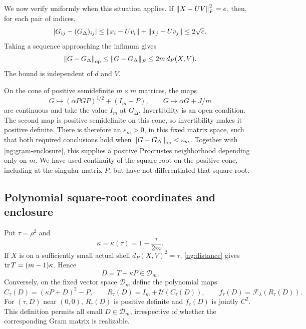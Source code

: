 We now verify uniformly when this situation applies. If
$\left\lVert X-UV\right\rVert_F^2=e$, then, for each pair of indices,
\[
 |G_{ij}-(G_\Delta)_{ij}|
 \le\left\lVert x_i-Uv_i\right\rVert+\left\lVert x_j-Uv_j\right\rVert\le2\sqrt e.
\]
Taking a sequence approaching the infimum gives
\begin{equation}\label{ng:gram-enclosure}
 \left\lVert G-G_\Delta\right\rVert_{\mathrm{op}}
 \le\left\lVert G-G_\Delta\right\rVert_F\le2m\,d_P(X,V).
\end{equation}
The bound is independent of $d$ and $V$.

On the cone of positive semidefinite $m\times m$ matrices, the maps
\[
 G\longmapsto(\alpha PGP)^{1/2}+(I_m-P),\qquad
 G\longmapsto\alpha G+J/m
\]
are continuous and take the value $I_m$ at $G_\Delta$.
Invertibility is an open condition. The second map is positive
semidefinite on this cone, so invertibility makes it positive definite.
There is therefore an $\varepsilon_m>0$, in this fixed matrix space,
such that both required conclusions hold when
$\left\lVert G-G_\Delta\right\rVert_{\mathrm{op}}<\varepsilon_m$.
Together with \eqref{ng:gram-enclosure}, this supplies a positive
Procrustes neighborhood depending only on $m$. We have used continuity
of the square root on the positive cone, including at the singular
matrix $P$, but have not differentiated that square root.

\subsection{Polynomial square-root coordinates and enclosure}
\label{ng:chart}

Put $\tau=\rho^2$ and
\[
 \kappa=\kappa(\tau)=1-\frac{\tau}{2m}.
\]
If $X$ is on a sufficiently small actual shell $d_P(X,V)^2=\tau$,
\eqref{ng:distance} gives $\operatorname{tr} T=(m-1)\kappa$. Hence
\begin{equation}\label{ng:actual-deviation}
 D=T-\kappa P\in\mathcal D_m.
\end{equation}
Conversely, on the fixed vector space $\mathcal D_m$ define the polynomial
maps
\begin{equation}\label{ng:polynomial-chart}
 C_\tau(D)=(\kappa P+D)^2-P,\qquad
 R_\tau(D)=I_m+\mathcal U(C_\tau(D)),\qquad
 f_\tau(D)=\mathcal F_\lambda(R_\tau(D)).
\end{equation}
For $(\tau,D)$ near $(0,0)$, $R_\tau(D)$ is positive definite and
$f_\tau(D)$ is jointly $C^2$. This definition permits all small
$D\in\mathcal D_m$, irrespective of whether the corresponding Gram
matrix is realizable.

